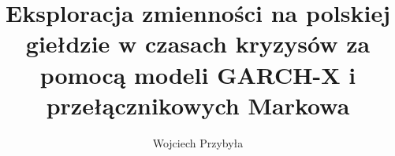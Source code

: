 \usepackage{config/uepThesis}
\usepackage{config/uepTitle}
	\title{Eksploracja zmienności na polskiej giełdzie w czasach kryzysów za pomocą modeli GARCH-X i przełącznikowych Markowa}
	\author{Wojciech Przybyła}

\usepackage{booktabs}
\pagestyle{headings}
\usepackage{fancyhdr} 
\usepackage{color}
\usepackage{polski}
\usepackage{float}
  \makeatletter
	\renewcommand{\slimits@}{\limits} %
	\renewcommand{\nmlimits@}{\limits}
	\makeatother
	\renewcommand{\le}{\leqslant} %
	\renewcommand{\ge}{\geqslant}
	\renewcommand{\epsilon}{\varepsilon}
\usepackage[nottoc]{tocbibind}

\renewcommand{\thefigure}{\thechapter.\arabic{figure}}
\renewcommand{\thetable}{\thechapter.\arabic{table}}

\usepackage{setspace}
\setlength\parindent{0.5cm}
\setlength{\headheight}{15pt}


